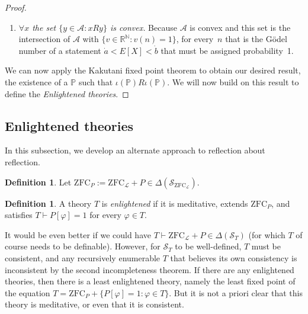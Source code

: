\documentclass[12pt]{article}
\newcommand{\PP}{\mathbb{P}}
\newcommand{\vp}{\varphi}
\newcommand{\RR}{\mathbb{R}}
\newcommand{\NN}{\mathbb{N}}
\newcommand{\zfc}{\mathrm{ZFC}}
\newcommand{\zfcl}{{\zfc_\cL}}
\newcommand{\zfcp}{{\zfc_P}}
\newcommand{\cL}{\mathcal{L}}
\newcommand{\cS}{\mathcal{S}}
\theoremstyle{plain}
\theoremstyle{definition}
\newtheorem{definition}[theorem]{Definition}
\theoremstyle{remark}
\begin{document}
\begin{proof}
\begin{enumerate}
\item \emph{$\forall x$ the set $\{y \in \mathcal{A}: xRy\}$ is convex.} Because $\mathcal{A}$ is convex and this set is the intersection of $\mathcal{A}$ with $\{v\in\RR^\NN : v(n) = 1\}$, for every~$n$ that is the G\"odel number of a statement $\dot a < E[X] < \dot b$ that must be assigned probability~1.
\end{enumerate}


We can now apply the Kakutani fixed point theorem to obtain our desired result, the existence of a $\PP$ such that $\iota(\PP)R\iota(\PP)$. We will now build on this result to define the \emph{Enlightened theories}.

\end{proof}
\subsection{Enlightened theories}
In this subsection, we develop an alternate approach to reflection about reflection.
\begin{definition}
Let $\zfcp := \zfcl + P\in\Delta(\cS_\zfcl)$.
\end{definition}
\begin{definition}
A theory $T$ is \emph{enlightened} if it is meditative, extends $\zfcp$, and satisfies $T\vdash P[\vp] = 1$ for every $\vp\in T$.
\end{definition}
It would be even better if we could have $T\vdash\zfcl + P\in\Delta(\cS_T)$ (for which $T$ of course needs to be definable). However, for $\cS_T$ to be well-defined, $T$ must be consistent, and any recursively enumerable $T$ that believes its own consistency is inconsistent by the second incompleteness theorem.
If there are any enlightened theories, then there is a least enlightened theory, namely the least fixed point of the equation $T = \zfcp + \{P[\vp] = 1 : \vp\in T\}$. But it is not a priori clear that this theory is meditative, or even that it is consistent. 
\end{document}
